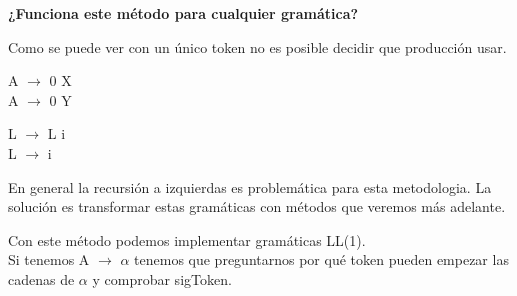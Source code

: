 \documentclass[\main/ApuntesPL.tex]{subfiles}
\begin{document}
    \newpage
    \par
    \textbf{¿Funciona este método para cualquier gramática?}

    \bigskip
    \par
    Como se puede ver con un único token no es posible decidir que producción usar.
    \begin{center}
      \begin{minipage}{.2\textwidth}
        A $\rightarrow$ 0 X\\
        A $\rightarrow$ 0 Y
      \end{minipage}%
      \begin{minipage}{.2\textwidth}
        L $\rightarrow$ L i\\
        L $\rightarrow$ i
      \end{minipage}
    \end{center}

    \par
    En general la recursión a izquierdas es problemática para esta metodologia. La solución
    es transformar estas gramáticas con métodos que veremos más adelante.

    \vspace{5mm}

    \vspace{3mm}
    \par
    Con este método podemos implementar gramáticas LL(1).\\
    Si tenemos A $\rightarrow$ $\alpha$ tenemos que preguntarnos por qué token pueden empezar las
    cadenas de $\alpha$ y comprobar sigToken.
\end{document}
